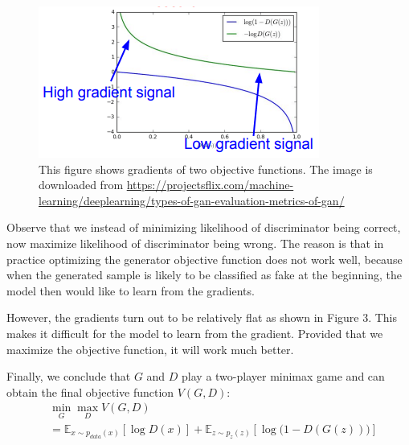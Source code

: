\documentclass[10pt,twocolumn,letterpaper]{article}
\begin{document}
\begin{figure}[htpb]
\begin{center}
   \includegraphics[scale=1]{images/1-3.png}
\end{center}
   \caption{\footnotesize This figure shows gradients of two objective functions. The image is downloaded from \href{https://projectsflix.com/machine-learning/deeplearning/types-of-gan-evaluation-metrics-of-gan/}{https://projectsflix.com/machine-learning/deeplearning/types-of-gan-evaluation-metrics-of-gan/}}
\end{figure}
Observe that we instead of minimizing likelihood of discriminator being correct, now
maximize likelihood of discriminator being wrong.
The reason is that in practice optimizing the generator objective function does not work well, because when the generated sample is likely to be classified as fake at the beginning, the model then would like to learn from the gradients. 

However, the gradients turn out to be relatively flat as shown in Figure 3. This makes it difficult for the model to learn from the gradient. Provided that we maximize the objective function, it will work much better.

Finally, we conclude that $G$ and $D$ play a two-player minimax game and can obtain the final objective function $V(G, D)$:
\begin{align*}
    &\min\limits_G\max\limits_DV(G, D)\\ &= \mathbb{E}_{x \sim p_{data}(x)}[\log{D(x)}] + \mathbb{E}_{z \sim p_z(z)}[\log{\big(1 - D(G(z))\big)}]
\end{align*}
\end{document}
